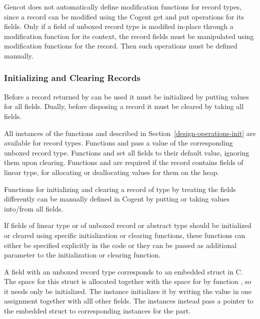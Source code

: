 Gencot does not automatically define modification functions for record types, since a record can be modified using the
Cogent get and put operations for its fields. Only if a field of unboxed record type is modified in-place through a 
modification function for its context, the record fields
must be manipulated using modification functions for the record. Then such operations must be defined manually.

\subsubsection{Initializing and Clearing Records}

Before a record returned by  can be used it must be initialized by putting values for all fields. 
Dually, before disposing a record it must be cleared by taking all fields.

All instances of the functions  and  described in 
Section~\ref{design-operations-init} are available
for record types. Functions  and  pass a value of the corresponding
unboxed record type. Functions  and  set all fields to
their default value, ignoring them upon clearing. Functions  and  
are required if the record contains fields of linear type, for allocating or deallocating values for them on the heap.

Functions
for initializing and clearing a record  of type  by treating the fields differently can be manually 
defined in Cogent by putting or taking values into/from all fields.

If fields of linear type or of unboxed record or abstract type should be initialized or cleared using specific initialization
or clearing functions, these functions can either be specified explicitly in the code or they can be passed as additional
parameter to the initialization or clearing function. 

A field  with an unboxed record type  corresponds to an embedded struct in C. The space for this struct is allocated together
with the space for  by function , so it needs only be initialized. The  instance initializes 
it by writing the value in one assignment together with alll other fields. The  instances instead pass a pointer 
to the embedded struct to corresponding  instances for the part. 

